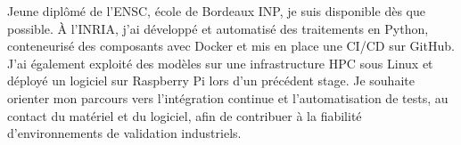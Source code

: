 
\begin{cvparagraph}
Jeune diplômé de l’ENSC, école de Bordeaux INP, je suis disponible dès que possible. À l’INRIA, j’ai développé et automatisé des traitements en Python, conteneurisé des composants avec Docker et mis en place une CI/CD sur GitHub. J’ai également exploité des modèles sur une infrastructure HPC sous Linux et déployé un logiciel sur Raspberry Pi lors d’un précédent stage. Je souhaite orienter mon parcours vers l’intégration continue et l’automatisation de tests, au contact du matériel et du logiciel, afin de contribuer à la fiabilité d’environnements de validation industriels.
\end{cvparagraph}
